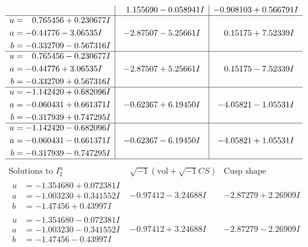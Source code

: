 \documentclass[1p]{elsarticle_modified}
\theoremstyle{definition}
\newcommand{\I}{\sqrt{-1}}
\begin{document}
$$\begin{array}{c|c|c}
 & \phantom{-}1.155690 - 0.058941 I & -0.908103 + 0.566791 I \\ \hline\begin{aligned}
u &= \phantom{-}0.765456 + 0.230677 I \\
a &= -0.44776 - 3.06535 I \\
b &= -0.332709 - 0.567316 I\end{aligned}
 & -2.87507 - 5.25661 I & \phantom{-}0.15175 + 7.52339 I \\ \hline\begin{aligned}
u &= \phantom{-}0.765456 - 0.230677 I \\
a &= -0.44776 + 3.06535 I \\
b &= -0.332709 + 0.567316 I\end{aligned}
 & -2.87507 + 5.25661 I & \phantom{-}0.15175 - 7.52339 I \\ \hline\begin{aligned}
u &= -1.142420 + 0.682096 I \\
a &= -0.060431 + 0.661371 I \\
b &= -0.317939 + 0.747295 I\end{aligned}
 & -0.62367 + 6.19450 I & -4.05821 - 1.05531 I \\ \hline\begin{aligned}
u &= -1.142420 - 0.682096 I \\
a &= -0.060431 - 0.661371 I \\
b &= -0.317939 - 0.747295 I\end{aligned}
 & -0.62367 - 6.19450 I & -4.05821 + 1.05531 I\\
 \hline 
 \end{array}$$\newpage$$\begin{array}{c|c|c}  
\text{Solutions to }I^u_{2}& \I (\text{vol} + \sqrt{-1}CS) & \text{Cusp shape}\\
 \hline 
\begin{aligned}
u &= -1.354680 + 0.072381 I \\
a &= -1.003230 + 0.341552 I \\
b &= -1.47456 + 0.43997 I\end{aligned}
 & -0.97412 - 3.24688 I & -2.87279 + 2.26909 I \\ \hline\begin{aligned}
u &= -1.354680 - 0.072381 I \\
a &= -1.003230 - 0.341552 I \\
b &= -1.47456 - 0.43997 I\end{aligned}
 & -0.97412 + 3.24688 I & -2.87279 - 2.26909 I \\ \hline\begin{aligned}

\end{aligned}
\end{array}$$
\end{document}
